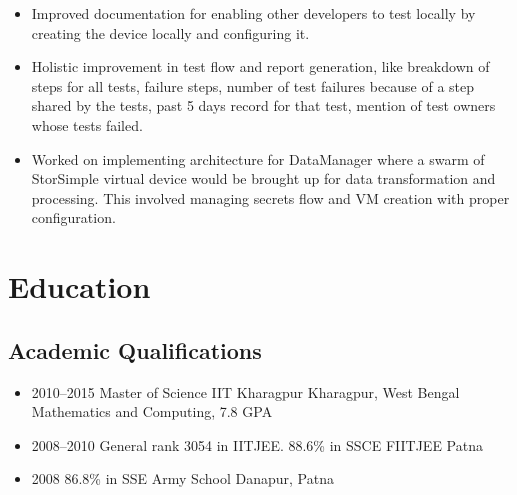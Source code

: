\documentclass[11pt,a4paper,sans]{moderncv}
\begin{document}
\begin{itemize}
\begin{itemize}
        \vspace{1pt}
      \item
        Improved documentation for enabling other developers to test locally by creating the device locally and configuring it.
        \vspace{1pt}
      \item
        Holistic improvement in test flow and report generation, like breakdown of steps for all tests, failure steps, number of test failures because of a step shared by the tests, past 5 days record for that test, mention of test owners whose tests failed.
        \vspace{1pt}
      \item
        Worked on implementing architecture for DataManager where a swarm of StorSimple virtual device would be brought up for data transformation and processing. This involved managing secrets flow and VM creation with proper configuration.
        \vspace{1pt}
    \end{itemize}
\end{itemize}
\section{Education}
\vspace{5pt}
\subsection{Academic Qualifications}
\vspace{5pt}
\begin{itemize}
  \item
    \cventry
    {2010--2015}
    {Master of Science}
    {IIT Kharagpur}
    {Kharagpur, West Bengal}
    {Mathematics and Computing, 7.8 GPA}
    {}
    \vspace{7pt}
  \item
    \cventry
    {2008--2010}
    {General rank 3054 in IITJEE. 88.6\% in SSCE}
    {FIITJEE}
    {Patna}
    {}
    {}
    \vspace{7pt}
  \item
    \cventry
    {2008}
    {86.8\% in SSE}
    {Army School}
    {Danapur, Patna}
    {}
    {}
\end{itemize}
\vspace{8pt}
\end{document}
